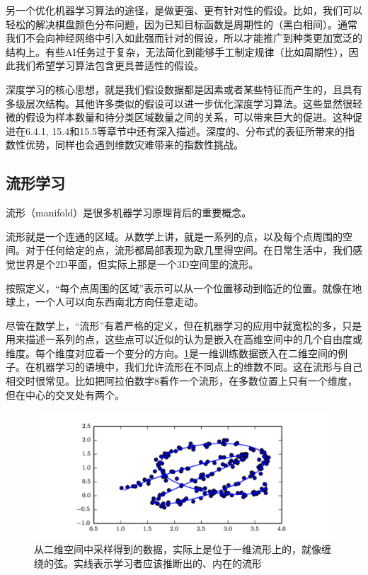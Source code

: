 另一个优化机器学习算法的途径，是做更强、更有针对性的假设。比如，我们可以轻松的解决棋盘颜色分布问题，因为已知目标函数是周期性的（黑白相间）。通常我们不会向神经网络中引入如此强而针对的假设，所以才能推广到种类更加宽泛的结构上。有些AI任务过于复杂，无法简化到能够手工制定规律（比如周期性），因此我们希望学习算法包含更具普适性的假设。

深度学习的核心思想，就是我们假设数据都是因素或者某些特征而产生的，且具有多级层次结构。其他许多类似的假设可以进一步优化深度学习算法。这些显然很轻微的假设为样本数量和待分类区域数量之间的关系，可以带来巨大的促进。这种促进在6.4.1, 15.4和15.5等章节中还有深入描述。深度的、分布式的表征所带来的指数性优势，同样也会遇到维数灾难带来的指数性挑战。

\subsection{流形学习}
\label{sec:5.11.3}

流形（manifold）是很多机器学习原理背后的重要概念。

流形就是一个连通的区域。从数学上讲，就是一系列的点，以及每个点周围的空间。对于任何给定的点，流形都局部表现为欧几里得空间。在日常生活中，我们感觉世界是个2D平面，但实际上那是一个3D空间里的流形。

按照定义，“每个点周围的区域”表示可以从一个位置移动到临近的位置。就像在地球上，一个人可以向东西南北方向任意走动。

尽管在数学上，“流形”有着严格的定义，但在机器学习的应用中就宽松的多，只是用来描述一系列的点，这些点可以近似的认为是嵌入在高维空间中的几个自由度或维度。每个维度对应着一个变分的方向。\ref{fig:5_11}是一维训练数据嵌入在二维空间的例子。在机器学习的语境中，我们允许流形在不同点上的维数不同。这在流形与自己相交时很常见。比如把阿拉伯数字8看作一个流形，在多数位置上只有一个维度，但在中心的交叉处有两个。

\begin{figure}[htbp]
   \centering
   \includegraphics[width=6in]{fig/chap5/5_11.png} 
   \caption{从二维空间中采样得到的数据，实际上是位于一维流形上的，就像缠绕的弦。实线表示学习者应该推断出的、内在的流形}
   \label{fig:5_11}
\end{figure}

